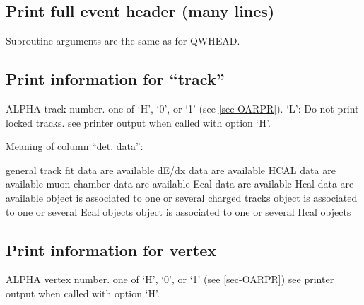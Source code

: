 \subsection{\label{sec-QWHF}Print full event header (many lines)}
\par
{}
\par
\par
Subroutine arguments are the same as for QWHEAD.
 
\subsection{\label{sec-QWTK}Print information for ``track''}
\par
{}
\par
\par
\begin{indentlist}{ 2.50cm}{ 2.75cm}
ALPHA track number.
one of `H', `0', or `1' (see \ref{sec-OARPR}).
`L': Do not print locked tracks.
see printer output when called with option `H'.
 
Meaning of column ``det. data'':
\begin{indentlist}{ 1.25cm}{ 1.50cm}
general track fit data are available
dE/dx data are available
HCAL data are available
muon chamber data are available
Ecal data are available
Hcal data are available
object is associated to one or several charged tracks
object is associated to one or several Ecal objects
object is associated to one or several Hcal objects
\end{indentlist}
\end{indentlist}
\subsection{\label{sec-QWV}Print information for vertex}
\par
{}
\par
\begin{indentlist}{ 2.50cm}{ 2.75cm}
ALPHA vertex number.
one of `H', `0', or `1' (see \ref{sec-OARPR})
see printer output when called with option `H'.
 
\end{indentlist}
